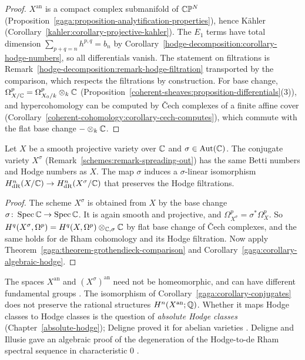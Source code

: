 \begin{proof}
$X^{\mathrm{an}}$ is a compact complex submanifold of $\mathbb{C}\mathbb{P}^N$ (Proposition~\ref{gaga:proposition-analytification-properties}), hence K\"ahler
(Corollary~\ref{kahler:corollary-projective-kahler}). The $E_1$ terms have total dimension $\sum_{p+q=n}h^{p,q} = b_n$ by
Corollary~\ref{hodge-decomposition:corollary-hodge-numbers}, so all differentials vanish. The statement on filtrations is Remark~\ref{hodge-decomposition:remark-hodge-filtration}
transported by the comparison, which respects the filtrations by construction. For base change, $\Omega^p_{X/\mathbb{C}} = \Omega^p_{X_0/k} \otimes_k\mathbb{C}$
(Proposition~\ref{coherent-sheaves:proposition-differentials}(3)), and hypercohomology can be computed by \v{C}ech complexes of a finite affine cover
(Corollary~\ref{coherent-cohomology:corollary-cech-computes}), which commute with the flat base change $- \otimes_k\mathbb{C}$.
\end{proof}

\begin{corollary}\label{gaga:corollary-conjugates}
Let $X$ be a smooth projective variety over $\mathbb{C}$ and $\sigma \in \mathrm{Aut}(\mathbb{C})$. The conjugate variety $X^\sigma$ (Remark~\ref{schemes:remark-spreading-out}) has the same
Betti numbers and Hodge numbers as $X$. The map $\sigma$ induces a $\sigma$-linear isomorphism $H^n_{\mathrm{dR}}(X/\mathbb{C}) \to H^n_{\mathrm{dR}}(X^\sigma/\mathbb{C})$ that preserves the
Hodge filtrations.
\end{corollary}

\begin{proof}
The scheme $X^\sigma$ is obtained from $X$ by the base change $\sigma \colon \operatorname{Spec}\mathbb{C} \to \operatorname{Spec}\mathbb{C}$. It is again smooth and projective, and $\Omega^p_{X^\sigma} = \sigma^*\Omega^p_X$. So
$H^q(X^\sigma, \Omega^p) = H^q(X, \Omega^p) \otimes_{\mathbb{C},\sigma}\mathbb{C}$ by flat base change of \v{C}ech complexes, and the same holds for de Rham cohomology and its Hodge
filtration. Now apply Theorem~\ref{gaga:theorem-grothendieck-comparison} and Corollary~\ref{gaga:corollary-algebraic-hodge}.
\end{proof}

\begin{remark}\label{gaga:remark-conjugates-not-homeomorphic}
The spaces $X^{\mathrm{an}}$ and $(X^\sigma)^{\mathrm{an}}$ need not be homeomorphic, and can have different fundamental groups \cite{serre-1964}. The isomorphism of
Corollary~\ref{gaga:corollary-conjugates} does not preserve the rational structures $H^n(X^{\mathrm{an}}; \mathbb{Q})$. Whether it maps Hodge classes to Hodge classes is the question of
\emph{absolute Hodge classes} (Chapter~\ref{absolute-hodge}); Deligne proved it for abelian varieties \cite{deligne-abelian}. Deligne and Illusie gave an algebraic proof of the degeneration of the
Hodge-to-de Rham spectral sequence in characteristic $0$ \cite{deligne-illusie}.
\end{remark}

